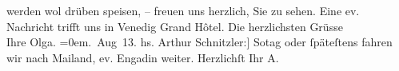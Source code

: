\begin{ledgroupsized}[t]{13cm}
               werden wol drüben speisen, – freuen uns herzlich, Sie zu sehen. Eine ev. Nachricht
               trifft uns in Venedig Grand Hôtel.\pend
           \pstart
           Die herzlichsten Grüsse{\\[\baselineskip]}Ihre \spacefill\mbox{Olga.}\pend
           \leftskip=0em{}. Aug 13.\pend
           \pstart
           \noindent{}{\pb}{[}hs. Arthur Schnitzler:{]} So{\geminationn}tag oder ſpäteſtens \label{K_L02149-2v}\label{K_L02149-2h} fahren wir nach Mailand, ev. Engadin weiter.\pend
           \pstart Herzlichſt Ihr \spacefill\mbox{A.}\pend{}
         
         \endnumbering{}\end{ledgroupsized}  \newcommand{\dateiname}{L02149}\newcommand{\titel}{Olga und Arthur Schnitzler an Richard und Paula Beer-Hofmann, 20. 8. 1913}\newcommand{\editorInnen}{Martin Anton Müller und Gerd-Hermann Susen}
      